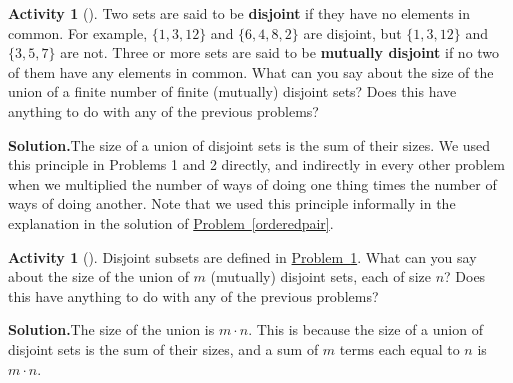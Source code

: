 \documentclass[10pt,]{book}
\newcommand{\terminology}[1]{\textbf{#1}}
\theoremstyle{plain}
\theoremstyle{definition}
\newtheorem{activity}[project]{Activity}
\numberwithin{equation}{chapter}
\begin{document}
\begin{activity}[]\label{sum}
Two sets are said to be \terminology{disjoint} if they have no elements in common. For example, \(\{1,3,12\}\) and \(\{6, 4, 8, 2\}\) are disjoint, but \(\{1,3,12\}\) and \(\{3,5,7\}\) are not. Three or more sets are said to be \terminology{mutually disjoint} if no two of them have any elements in common. What can you say about the size of the union of a finite number of finite (mutually) disjoint sets? Does this have anything to do with any of the previous problems?%
\par\medskip\noindent%
\textbf{Solution.}\quad The size of a union of disjoint sets is the sum of their sizes. We used this principle in Problems 1 and 2 directly, and indirectly in every other problem when we multiplied the number of ways of doing one thing times the number of ways of doing another. Note that we used this principle informally in the explanation in the solution of \hyperref[orderedpair]{Problem~\ref{orderedpair}}.%
\end{activity}
\begin{activity}[]\label{product}
Disjoint subsets are defined in \hyperref[sum]{Problem~\ref{sum}}. What can you say about the size of the union of \(m\) (mutually) disjoint sets, each of size \(n\)? Does this have anything to do with any of the previous problems?%
\par\medskip\noindent%
\textbf{Solution.}\quad The size of the union is \(m\cdot n\). This is because the size of a union of disjoint sets is the sum of their sizes, and a sum of \(m\) terms each equal to \(n\) is \(m\cdot n\).%
\end{activity}
\typeout{************************************************}
\typeout{************************************************}
\end{document}
